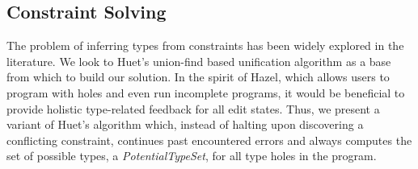 



\usetikzlibrary{positioning,calc}

\subsection{Constraint Solving}
\label{sec:infalg}
The problem of inferring types from constraints has been widely explored in the literature. We look to Huet's union-find based unification algorithm \cite{G. Huet} as a base from which to build our solution. In the spirit of Hazel, which allows users to program with holes and even run incomplete programs, it would be beneficial to provide holistic type-related feedback for all edit states. Thus, we present a variant of Huet's algorithm which, instead of halting upon discovering a conflicting constraint, continues past encountered errors and always computes the set of possible types, a \textit{PotentialTypeSet}, for all type holes in the program.

